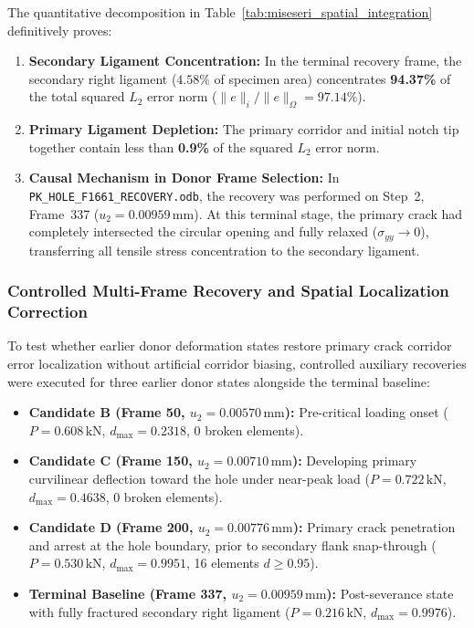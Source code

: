 The quantitative decomposition in Table~\ref{tab:miseseri_spatial_integration} definitively proves:
\begin{enumerate}
  \item \textbf{Secondary Ligament Concentration:} In the terminal recovery frame, the secondary right ligament ($4.58\%$ of specimen area) concentrates \textbf{94.37\%} of the total squared $L_2$ error norm ($\|e\|_i / \|e\|_{\Omega} = 97.14\%$).
  \item \textbf{Primary Ligament Depletion:} The primary corridor and initial notch tip together contain less than \textbf{0.9\%} of the squared $L_2$ error norm.
  \item \textbf{Causal Mechanism in Donor Frame Selection:} In \texttt{PK\_HOLE\_F1661\_RECOVERY.odb}, the recovery was performed on Step~2, Frame~337 ($u_2 = 0.00959\,\mathrm{mm}$). At this terminal stage, the primary crack had completely intersected the circular opening and fully relaxed ($\sigma_{yy} \to 0$), transferring all tensile stress concentration to the secondary ligament.
\end{enumerate}

\subsubsection{Controlled Multi-Frame Recovery and Spatial Localization Correction}
\label{subsec:controlled_multi_frame_recovery}

To test whether earlier donor deformation states restore primary crack corridor error localization without artificial corridor biasing, controlled auxiliary recoveries were executed for three earlier donor states alongside the terminal baseline:
\begin{itemize}
  \item \textbf{Candidate B (Frame 50, $u_2 = 0.00570\,\mathrm{mm}$):} Pre-critical loading onset ($P = 0.608\,\mathrm{kN}$, $d_{\max} = 0.2318$, 0 broken elements).
  \item \textbf{Candidate C (Frame 150, $u_2 = 0.00710\,\mathrm{mm}$):} Developing primary curvilinear deflection toward the hole under near-peak load ($P = 0.722\,\mathrm{kN}$, $d_{\max} = 0.4638$, 0 broken elements).
  \item \textbf{Candidate D (Frame 200, $u_2 = 0.00776\,\mathrm{mm}$):} Primary crack penetration and arrest at the hole boundary, prior to secondary flank snap-through ($P = 0.530\,\mathrm{kN}$, $d_{\max} = 0.9951$, 16 elements $d \ge 0.95$).
  \item \textbf{Terminal Baseline (Frame 337, $u_2 = 0.00959\,\mathrm{mm}$):} Post-severance state with fully fractured secondary right ligament ($P = 0.216\,\mathrm{kN}$, $d_{\max} = 0.9976$).
\end{itemize}

